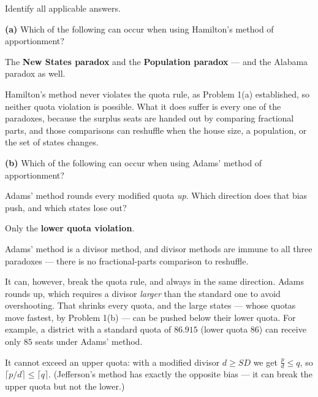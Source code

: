 \documentclass[12pt]{ximera}
\begin{document}
\begin{problem}
Identify all applicable answers.

\begin{prompt}
\textbf{(a)} Which of the following can occur when using Hamilton's method of
apportionment?

\begin{selectAll}
\end{selectAll}

\begin{feedback}
The \textbf{New States paradox} and the \textbf{Population paradox} --- and the Alabama
paradox as well.

Hamilton's method never violates the quota rule, as Problem 1(a) established, so neither
quota violation is possible. What it does suffer is every one of the paradoxes, because
the surplus seats are handed out by comparing fractional parts, and those comparisons can
reshuffle when the house size, a population, or the set of states changes.
\end{feedback}
\end{prompt}

\begin{prompt}
\textbf{(b)} Which of the following can occur when using Adams' method of
apportionment?

\begin{selectAll}
\end{selectAll}

\begin{hint}
Adams' method rounds every modified quota \emph{up}. Which direction does that bias
push, and which states lose out?
\end{hint}

\begin{feedback}
Only the \textbf{lower quota violation}.

Adams' method is a divisor method, and divisor methods are immune to all three
paradoxes --- there is no fractional-parts comparison to reshuffle.

It can, however, break the quota rule, and always in the same direction. Adams rounds
up, which requires a divisor \emph{larger} than the standard one to avoid overshooting.
That shrinks every quota, and the large states --- whose quotas move fastest, by Problem
1(b) --- can be pushed below their lower quota. For example, a district with a standard quota of $86.915$ (lower quota $86$) can
receive only $85$ seats under Adams' method.

It cannot exceed an upper quota: with a modified divisor $d \ge SD$ we get
$\frac{p}{d} \le q$, so $\lceil p/d\rceil \le \lceil q\rceil$. (Jefferson's method has
exactly the opposite bias --- it can break the upper quota but not the lower.)
\end{feedback}
\end{prompt}
\end{problem}
\end{document}
